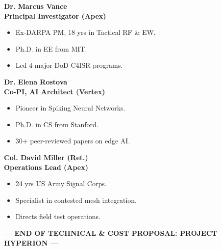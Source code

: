 \documentclass[10pt,a4paper]{article}
\begin{document}
\noindent
\begin{minipage}[t]{0.31\linewidth}
  \begin{tcolorbox}[cardbox]
    \textbf{\color{NavyPrimary}Dr. Marcus Vance}\\
    {\scriptsize\bfseries Principal Investigator (Apex)}
    \vspace{3pt}
    \begin{itemize}[leftmargin=10pt,label=\tiny$\blacksquare$,itemsep=1pt]
      \item Ex-DARPA PM, 18 yrs in Tactical RF \& EW.
      \item Ph.D. in EE from MIT.
      \item Led 4 major DoD C4ISR programs.
    \end{itemize}
  \end{tcolorbox}
\end{minipage}%
\hfill
\begin{minipage}[t]{0.31\linewidth}
  \begin{tcolorbox}[cardbox]
    \textbf{\color{NavyPrimary}Dr. Elena Rostova}\\
    {\scriptsize\bfseries Co-PI, AI Architect (Vertex)}
    \vspace{3pt}
    \begin{itemize}[leftmargin=10pt,label=\tiny$\blacksquare$,itemsep=1pt]
      \item Pioneer in Spiking Neural Networks.
      \item Ph.D. in CS from Stanford.
      \item 30+ peer-reviewed papers on edge AI.
    \end{itemize}
  \end{tcolorbox}
\end{minipage}%
\hfill
\begin{minipage}[t]{0.31\linewidth}
  \begin{tcolorbox}[cardbox]
    \textbf{\color{NavyPrimary}Col. David Miller (Ret.)}\\
    {\scriptsize\bfseries Operations Lead (Apex)}
    \vspace{3pt}
    \begin{itemize}[leftmargin=10pt,label=\tiny$\blacksquare$,itemsep=1pt]
      \item 24 yrs US Army Signal Corps.
      \item Specialist in contested mesh integration.
      \item Directs field test operations.
    \end{itemize}
  \end{tcolorbox}
\end{minipage}

\vspace{12pt}

\begin{center}
\small\textcolor{SlateDark}{\textbf{--- END OF TECHNICAL \& COST PROPOSAL: PROJECT HYPERION ---}}
\end{center}
\end{document}
